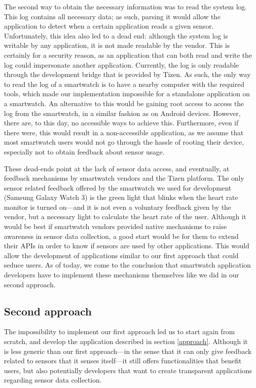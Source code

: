 \documentclass[conference, a4paper, 10pt, twocolumn]{IEEEtran}
\begin{document}
The second way to obtain the necessary information was to read the system log. This log contains all necessary data; as such, parsing it would allow the application to detect when a certain application reads a given sensor. Unfortunately, this idea also led to a dead end: although the system log is writable by any application, it is not made readable by the vendor. This is certainly for a security reason, as an application that can both read and write the log could impersonate another application. Currently, the log is only readable through the development bridge that is provided by Tizen. As such, the only way to read the log of a smartwatch is to have a nearby computer with the required tools, which made our implementation impossible for a standalone application on a smartwatch. An alternative to this would be gaining root access to access the log from the smartwatch, in a similar fashion as on Android devices. However, there are, to this day, no accessible ways to achieve this. Furthermore, even if there were, this would result in a non-accessible application, as we assume that most smartwatch users would not go through the hassle of rooting their device, especially not to obtain feedback about sensor usage. 


These dead-ends point at the lack of sensor data access, and eventually, at feedback mechanisms by smartwatch vendors and the Tizen platform. The only sensor related feedback offered by the smartwatch we used for development (Samsung Galaxy Watch 3) is the green light that blinks when the heart rate monitor is turned on---and it is not even a voluntary feedback given by the vendor, but a necessary light to calculate the heart rate of the user. Although it would be best if smartwatch vendors provided native mechanisms to raise awareness in sensor data collection, a good start would be for them to extend their \acp{API} in order to know if sensors are used by other applications. This would allow the development of applications similar to our first approach that could seduce users. As of today, we come to the conclusion that smartwatch application developers have to implement these mechanisms themselves like we did in our second approach.

\subsection{Second approach}
The impossibility to implement our first approach led us to start again from scratch, and develop the application described in section \ref{approach}. Although it is less generic than our first approach---in the sense that it can only give feedback related to sensors that it senses itself---it still offers functionalities that benefit users, but also potentially developers that want to create transparent applications regarding sensor data collection.
\end{document}
